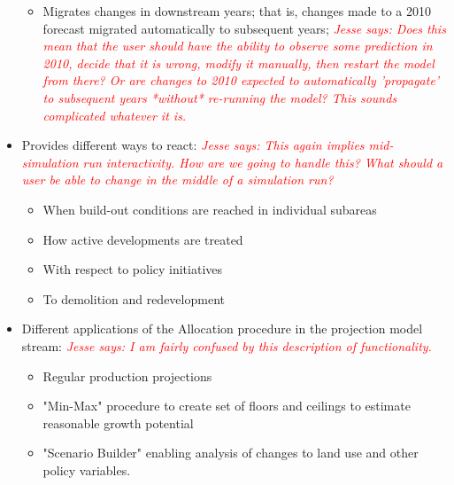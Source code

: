 \documentclass[titlepage]{article}
\begin{document}
\begin{itemize}
\begin{itemize}
			\item Migrates changes in downstream years; that is, changes made to a 2010 forecast migrated automatically to subsequent years;
				\textcolor{red}{\textit{Jesse says: Does this mean that the user should have the ability to observe some prediction in 2010, decide that it is wrong, modify it manually, then restart the model from there?  Or are changes to 2010 expected to automatically 'propagate' to subsequent years *without* re-running the model?  This sounds complicated whatever it is.}}
		\end{itemize}
	\item Provides different ways to react:
		\textcolor{red}{\textit{Jesse says: This again implies mid-simulation run interactivity.  How are we going to handle this? What should a user be able to change in the middle of a simulation run?}}
		\begin{itemize}
			\item When build-out conditions are reached in individual subareas
			\item How active developments are treated
			\item With respect to policy initiatives
			\item To demolition and redevelopment 
		\end{itemize}
	\item Different applications of the Allocation procedure in the projection model stream:
		\textcolor{red}{\textit{Jesse says: I am fairly confused by this description of functionality.}}
		\begin{itemize}
			\item Regular production projections
			\item "Min-Max" procedure to create set of floors and ceilings to estimate reasonable growth potential
			\item "Scenario Builder" enabling analysis of changes to land use and other policy variables. 
		\end{itemize}
\end{itemize}
\end{document}
